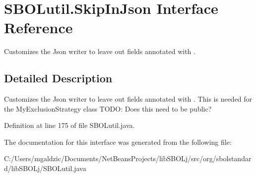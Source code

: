 \hypertarget{interfaceorg_1_1sbolstandard_1_1lib_s_b_o_lj_1_1_s_b_o_lutil_1_1_skip_in_json}{
\section{SBOLutil.SkipInJson Interface Reference}
\label{interfaceorg_1_1sbolstandard_1_1lib_s_b_o_lj_1_1_s_b_o_lutil_1_1_skip_in_json}
}


Customizes the Json writer to leave out fields annotated with .  




\subsection{Detailed Description}
Customizes the Json writer to leave out fields annotated with . This is needed for the MyExclusionStrategy class TODO: Does this need to be public? 

Definition at line 175 of file SBOLutil.java.



The documentation for this interface was generated from the following file:\begin{DoxyCompactItemize}
\item 
C:/Users/mgaldzic/Documents/NetBeansProjects/libSBOLj/src/org/sbolstandard/libSBOLj/SBOLutil.java\end{DoxyCompactItemize}

